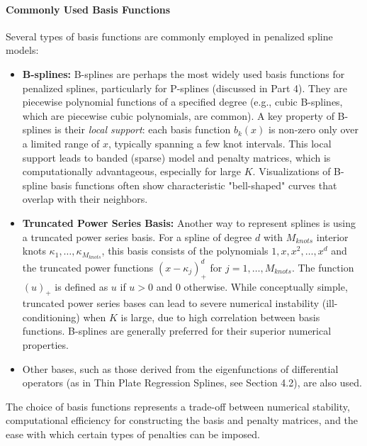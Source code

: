 \documentclass[11pt, a4paper]{article}
\begin{document}
\paragraph{Commonly Used Basis Functions}
Several types of basis functions are commonly employed in penalized spline models:
\begin{itemize}
 \item \textbf{B-splines:} B-splines are perhaps the most widely used basis functions for penalized splines, particularly for P-splines (discussed in Part 4). They are piecewise polynomial functions of a specified degree (e.g., cubic B-splines, which are piecewise cubic polynomials, are common). A key property of B-splines is their \textit{local support}: each basis function $b_k(x)$ is non-zero only over a limited range of $x$, typically spanning a few knot intervals. This local support leads to banded (sparse) model and penalty matrices, which is computationally advantageous, especially for large $K$. Visualizations of B-spline basis functions often show characteristic "bell-shaped" curves that overlap with their neighbors.

 \item \textbf{Truncated Power Series Basis:} Another way to represent splines is using a truncated power series basis. For a spline of degree $d$ with $M_{knots}$ interior knots $\kappa_1, \dots, \kappa_{M_{knots}}$, this basis consists of the polynomials $1, x, x^2, \dots, x^d$ and the truncated power functions $(x-\kappa_j)_+^d$ for $j=1, \dots, M_{knots}$. The function $(u)_+$ is defined as $u$ if $u > 0$ and $0$ otherwise. While conceptually simple, truncated power series bases can lead to severe numerical instability (ill-conditioning) when $K$ is large, due to high correlation between basis functions. B-splines are generally preferred for their superior numerical properties.

 \item Other bases, such as those derived from the eigenfunctions of differential operators (as in Thin Plate Regression Splines, see Section 4.2), are also used.
\end{itemize}
The choice of basis functions represents a trade-off between numerical stability, computational efficiency for constructing the basis and penalty matrices, and the ease with which certain types of penalties can be imposed.
\end{document}
